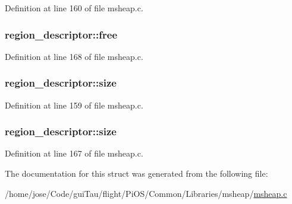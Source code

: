 Definition at line 160 of file msheap.\-c.

\hypertarget{structregion__descriptor_a727eaaf0293ecdb232142c45b80ce598}{
\subsubsection[{free}]{ region\-\_\-descriptor\-::free}}\label{structregion__descriptor_a727eaaf0293ecdb232142c45b80ce598}


Definition at line 168 of file msheap.\-c.

\hypertarget{structregion__descriptor_af2e510e77d4eda561cd30797ad5343cd}{
\subsubsection[{size}]{ region\-\_\-descriptor\-::size}}\label{structregion__descriptor_af2e510e77d4eda561cd30797ad5343cd}


Definition at line 159 of file msheap.\-c.

\hypertarget{structregion__descriptor_a0e40e919e69b9dbfdacc77bd31b565a4}{
\subsubsection[{size}]{ region\-\_\-descriptor\-::size}}\label{structregion__descriptor_a0e40e919e69b9dbfdacc77bd31b565a4}


Definition at line 167 of file msheap.\-c.



The documentation for this struct was generated from the following file\-:\begin{DoxyCompactItemize}
\item 
/home/jose/\-Code/gui\-Tau/flight/\-Pi\-O\-S/\-Common/\-Libraries/msheap/\hyperlink{msheap_8c}{msheap.\-c}\end{DoxyCompactItemize}
